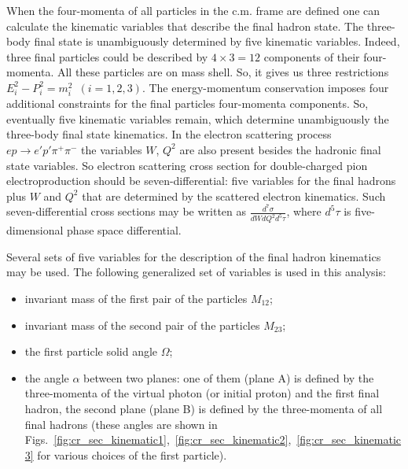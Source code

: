 When the four-momenta of all particles in the c.m. frame are defined one can calculate the kinematic variables that describe the final hadron state.
The three-body final state is 
unambiguously determined by five kinematic
variables. Indeed, three final particles could be
described by $4 \times 3 = 12$ components of
their four-momenta. All these particles are
on mass shell. So, it gives us three restrictions
$E_{i}^{2} -P_{i}^{2} =
m_{i}^{2}$~$(i=1,2,3)$. The energy-momentum
conservation imposes four additional constraints
for the final particles four-momenta
components. So, eventually five
kinematic variables remain, which determine
unambiguously the three-body final state
kinematics. In the electron scattering process $e
p \rightarrow e' p' \pi^{+} \pi^{-}$ 
the variables $W$, $Q^{2}$ are also present besides
the hadronic final state variables. So
electron scattering cross section for double-charged pion electroproduction should be
seven-differential: five variables for the final
hadrons plus $W$ and $Q^{2}$ that are determined by the
scattered electron kinematics. Such
seven-differential cross sections may be
written as
$\frac{d^{7}\sigma}{dWdQ^{2}d^{5}\tau}$,
where $d^{5}\tau$ is five-dimensional phase space differential.

Several sets of five variables for
the description of the final hadron kinematics may
be used. The following generalized set of
variables is used in this analysis:
\begin{itemize}
\item invariant mass of the first pair of the
particles $M_{12}$;
\item invariant mass of the second pair of the
particles $M_{23}$;
\item the first particle solid angle $\Omega$;
\item the angle $\alpha$ between two planes: one of
them (plane A) is defined by the three-momenta of
the virtual photon (or initial proton) and the first final hadron, the second
plane (plane B) is defined by the three-momenta of all final hadrons (these angles are shown in  Figs.~\ref{fig:cr_sec_kinematic1},~\ref{fig:cr_sec_kinematic2},~\ref{fig:cr_sec_kinematic3} for various choices of the first particle).
\end{itemize}

